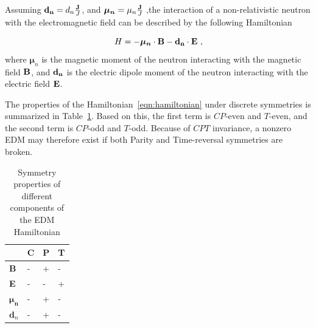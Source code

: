 

Assuming ${\bf{d_n}} = d_n \frac{\bf{J}}{J}$, and
$\boldsymbol{\mu_n} = \mu_n \frac{\bf{J}}{J}$ ,the interaction of a
non-relativistic neutron with the electromagnetic field can be
described by the following Hamiltonian

\begin{equation}
  \label{eqn:hamiltonian}
 H= -\boldsymbol{\mu_n} \cdot \bf{B} - \bf{d}_n \cdot \bf{E}~,
 \end{equation}
where $\boldsymbol{\mu}_n$ is the magnetic moment of the neutron
interacting with the magnetic field $\bf{B}$, and $\bf{d}_n$ is
the electric dipole moment of the neutron interacting with the
electric field $\bf{E}$.

The properties of the Hamiltonian~\ref{eqn:hamiltonian} under discrete
symmetries is summarized in Table~\ref{tab:Hsymmetry}. Based on this,
the first term is $CP$-even and $T$-even, and the second term is
$CP$-odd and $T$-odd. Because of $CPT$ invariance, a nonzero EDM may
therefore exist if both Parity and Time-reversal symmetries are
broken.


\begin{table}[h!]
\begin{center}
\begin{tabular}{| l | l | l | l |} 
\hline
 & C & P & T \\ \hline
\textbf{B} & - &+ &- \\ \hline
\textbf{E} & -&- &+ \\ \hline
$\boldsymbol{\mu_n}$ &- &+ &- \\ \hline 
$\textbf{d}_n$ & -&+ &- \\ \hline
\end{tabular}
\caption{Symmetry properties of different components of the EDM
  Hamiltonian  \label{tab:Hsymmetry}}
\end{center}
\end{table}
  
